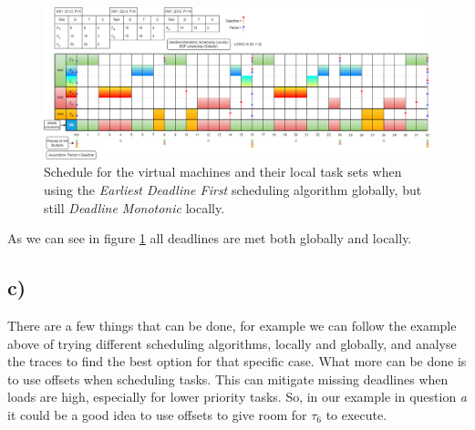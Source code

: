     \begin{figure}[H]
        \centering
        \includegraphics[width=1\textwidth]{images/AssQ3b.png}
        \caption{Schedule for the virtual machines and their local task sets when using the \textit{Earliest Deadline First} scheduling algorithm globally, but still \textit{Deadline Monotonic} locally.}
        \label{fig:3b}
    \end{figure}
    As we can see in figure \ref{fig:3b} all deadlines are met both globally and locally.

    \subsection*{c)}
    There are a few things that can be done, for example we can follow the example above of trying different scheduling algorithms, locally and globally, and analyse the traces to find the best option for that specific case. What more can be done is to use offsets when scheduling tasks. This can mitigate missing deadlines when loads are high, especially for lower priority tasks. So, in our example in question \textit{a} it could be a good idea to use offsets to give room for $\tau_6$ to execute.